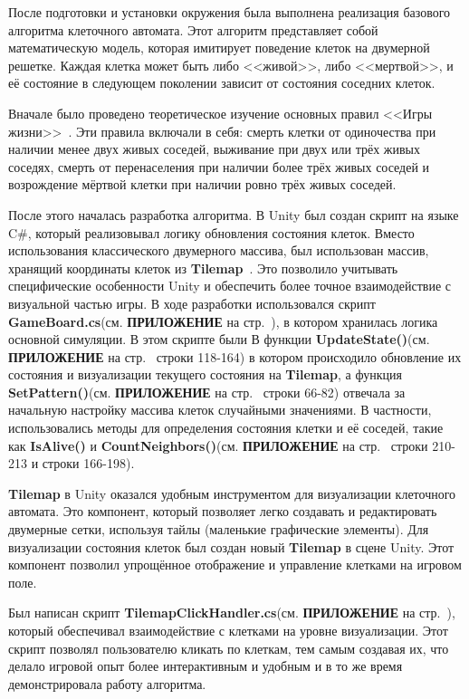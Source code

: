 После подготовки и установки окружения была выполнена реализация базового алгоритма клеточного автомата. Этот алгоритм представляет собой математическую модель, которая имитирует поведение клеток на двумерной решетке. Каждая клетка может быть либо <<живой>>, либо <<мертвой>>, и её состояние в следующем поколении зависит от состояния соседних клеток.

Вначале было проведено теоретическое изучение основных правил <<Игры жизни>>~\cite{GameLife}. Эти правила включали в себя: смерть клетки от одиночества при наличии менее двух живых соседей, выживание при двух или трёх живых соседях, смерть от перенаселения при наличии более трёх живых соседей и возрождение мёртвой клетки при наличии ровно трёх живых соседей.

После этого началась разработка алгоритма. В Unity был создан скрипт на языке C\#, который реализовывал логику обновления состояния клеток. Вместо использования классического двумерного массива, был использован массив, хранящий координаты клеток из \textbf{Tilemap}~\cite{tilemap}. Это позволило учитывать специфические особенности Unity и обеспечить более точное взаимодействие с визуальной частью игры. В ходе разработки использовался скрипт \textbf{GameBoard.cs}(см. \textbf{\textsc{ПРИЛОЖЕНИЕ}} на стр.~\pageref{code:brgame}), в котором хранилась логика основной симуляции. В этом скрипте были В функции \textbf{UpdateState()}(см. \textbf{\textsc{ПРИЛОЖЕНИЕ}} на стр.~\pageref{code:brgame} строки 118-164) в котором происходило обновление их состояния и визуализации текущего состояния на \textbf{Tilemap}, а функция \textbf{SetPattern()}(см. \textbf{\textsc{ПРИЛОЖЕНИЕ}} на стр.~\pageref{code:brgame} строки 66-82) отвечала за начальную настройку массива клеток случайными значениями.  В частности, использовались методы для определения состояния клетки и её соседей, такие как \textbf{IsAlive()} и \textbf{CountNeighbors()}(см. \textbf{\textsc{ПРИЛОЖЕНИЕ}} на стр.~\pageref{code:brgame} строки 210-213 и строки 166-198).

\textbf{Tilemap} в Unity оказался удобным инструментом для визуализации клеточного автомата. Это компонент, который позволяет легко создавать и редактировать двумерные сетки, используя тайлы (маленькие графические элементы). Для визуализации состояния клеток был создан новый \textbf{Tilemap} в сцене Unity. Этот компонент позволил упрощённое отображение и управление клетками на игровом поле.



Был написан скрипт \textbf{TilemapClickHandler.cs}(см. \textbf{\textsc{ПРИЛОЖЕНИЕ}} на стр.~\pageref{code:click}), который обеспечивал взаимодействие с клетками на уровне визуализации. Этот скрипт позволял пользователю кликать по клеткам, тем самым создавая их, что делало игровой опыт более интерактивным и удобным и в то же время демонстрировала работу алгоритма.

